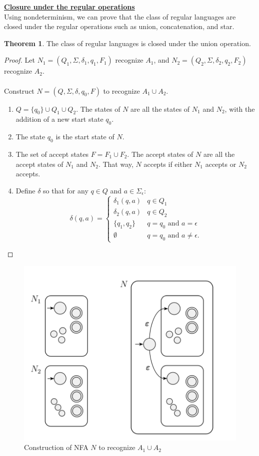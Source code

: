 \documentclass[11pt]{article}
\theoremstyle{definition}
\newtheorem{thm}{Theorem}[section]
\begin{document}
\textbf{\underline{Closure under the regular operations}}\\
Using nondeterminism, we can prove that the class of regular languages are closed under the regular operations such as union, concatenation, and star.
\begin{thm}
The class of regular languages is closed under the union operation.
\end{thm}
\begin{proof}
    Let $N_1 = (Q_1, \Sigma, \delta_1, q_1, F_1)$ recognize $A_1$, and $N_2= (Q_2, \Sigma, \delta_2, q_2, F_2)$ recognize $A_2$.\\\\
    Construct $N = (Q, \Sigma, \delta, q_0, F)$ to recognize $A_1\cup A_2$.
    \begin{enumerate}
        \item $Q = \{q_0\} \cup Q_1 \cup Q_2$. The states of $N$ are all the states of $N_1$ and $N_2$, with the addition of a new start state $q_0$.
        \item The state $q_0$ is the start state of $N$.
        \item The set of accept states $F=F_1\cup F_2$. The accept states of $N$ are all the accept states of $N_1$ and $N_2$. That way, $N$ accepts if either $N_1$ accepts or $N_2$ accepts.
        \item Define $\delta$ so that for any $q\in Q$ and $a\in \Sigma_\epsilon$:
        \begin{equation*}
            \delta(q,a) = \begin{cases}
               \delta_1(q,a)               & q\in Q_1\\
               \delta_2(q,a)               & q\in Q_2\\
               \{q_1,q_2\}               & q = q_0 \text{ and } a=\epsilon\\
               \emptyset               & q = q_0 \text{ and } a\neq\epsilon.
           \end{cases}
\end{equation*}
    \end{enumerate}
\end{proof}
\begin{figure}[h]
	\centering
	\includegraphics[width=0.5\linewidth]{nfa_union.png}
	\caption{Construction of NFA $N$ to recognize $A_1\cup A_2$}
	\label{fig}
\end{figure}
\end{document}
